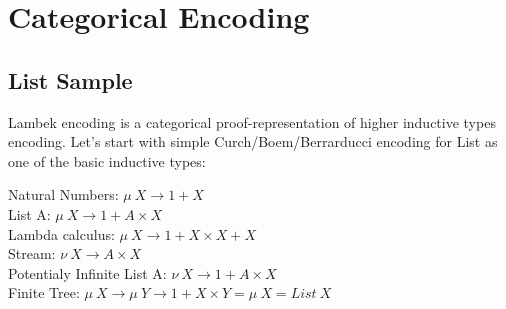 \documentclass[11pt,oneside]{article}
\begin{document}
\begingroup
\parbox[t][][l]{0.40\textwidth}{

\begin{prooftree}
\end{prooftree}

\begin{prooftree}
\end{prooftree}

}
\hspace{0.1cm}
\parbox[t][][r]{0.60\textwidth}{


\begin{prooftree}
\end{prooftree}

}
\endgroup



\newpage
\section{Categorical Encoding}

\subsection{List Sample}
  Lambek encoding is a categorical proof-representation of higher inductive types encoding.
  Let's start with simple Curch/Boem/Berrarducci encoding for List as one of the basic inductive types:

\begin{center}
  Natural Numbers: $\mu\ X \rightarrow 1 + X$ \\
  List A: $\mu\ X \rightarrow 1 + A \times X$ \\
  Lambda calculus: $\mu\ X \rightarrow 1 + X \times X + X$ \\
  Stream: $\nu\ X \rightarrow A \times X$ \\
  Potentialy Infinite List A: $\nu\ X \rightarrow 1 + A \times X$ \\
  Finite Tree: $\mu\ X \rightarrow \mu\ Y \rightarrow 1 + X \times Y = \mu\ X = List\ X$ \\
\end{center}
\end{document}
